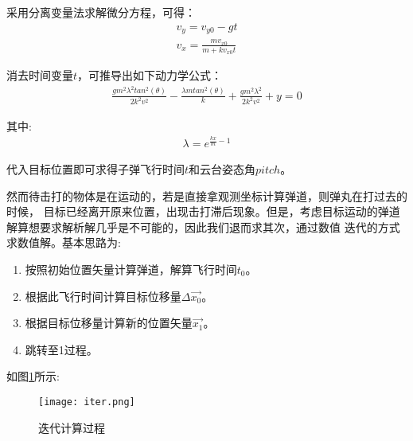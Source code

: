 采用分离变量法求解微分方程，可得：
\begin{gather}
    v_y = v_{y0}-gt \\
    v_x = \frac{m v_{x0}}{m+kv_{x0}t}
\end{gather}

消去时间变量$t$，可推导出如下动力学公式：
\begin{gather}
\frac{gm^2\lambda^2 tan^2(\theta)}{2k^2v^2}-\frac{\lambda m tan^2(\theta)}{k}+\frac{gm^2\lambda^2}{2k^2v^2}+y = 0
\end{gather}

其中:
\begin{gather}
    \lambda = e^{\frac{kx}{m}-1}
\end{gather}

代入目标位置即可求得子弹飞行时间$t$和云台姿态角$pitch$。\par
然而待击打的物体是在运动的，若是直接拿观测坐标计算弹道，则弹丸在打过去的时候，
目标已经离开原来位置，出现击打滞后现象。但是，考虑目标运动的弹道解算想要求解析解几乎是不可能的，因此我们退而求其次，通过数值
迭代的方式求数值解。基本思路为:
\begin{enumerate}
    \item 按照初始位置矢量计算弹道，解算飞行时间$t_0$。
    \item 根据此飞行时间计算目标位移量$\Delta \vec{x_0}$。
    \item 根据目标位移量计算新的位置矢量$\vec{x_1}$。
    \item 跳转至1过程。
\end{enumerate}

如图\ref{迭代计算过程}所示:

\begin{figure}[H]
    \centering
    \texttt{[image: iter.png]} 
    \caption{迭代计算过程} 
    \label{迭代计算过程}
\end{figure}